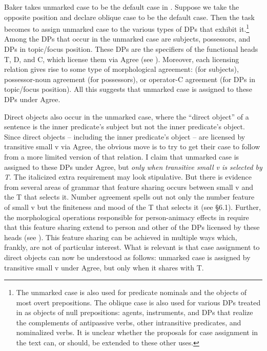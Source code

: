 \documentclass[output=paper,
modfonts
]{LSP/langsci}
\begin{document}
\begin{exe}
\begin{xlist}
Baker takes unmarked case to be the default case in . Suppose we
take the opposite position and declare oblique case to be the default
case. Then the task becomes to assign unmarked case to the various types
of  DPs that exhibit it.\footnote{The unmarked case is also used
  for predicate nominals and the objects of most overt prepositions. The
  oblique case is also used for various DPs treated in \citealt{chung1998} as
  objects of null prepositions:  agents, instruments, and DPs
  that realize the complements of antipassive verbs, other intransitive
  predicates, and nominalized verbs. It is unclear whether the proposals
  for case assignment in the text can, or should, be extended to these
  other uses.} Among the DPs that occur in the unmarked case are
subjects, possessors, and DPs in topic/focus position. These DPs are the
specifiers of the functional heads T, D, and C, which license them via
Agree (see \citealt{chung1998}). Moreover, each licensing relation gives rise to
some type of morphological agreement:  (for
subjects), possessor-noun agreement (for possessors), or operator-C
agreement (for DPs in topic/focus position). All this suggests that
unmarked case is assigned to these DPs under Agree.

Direct objects also occur in the unmarked case, where the ``direct
object'' of a  sentence is the inner predicate's subject but not
the inner predicate's object. Since direct objects -- including the inner
predicate's object -- are licensed by transitive small v via Agree, the
obvious move is to try to get their case to follow from a more limited
version of that relation. I claim that unmarked case is assigned to
these DPs under Agree, but \emph{only when transitive small v is
selected by T}. The italicized extra requirement may look stipulative.
But there is evidence from several areas of  grammar that
feature sharing occurs between small v and the T that selects it. Number
agreement spells out not only the number feature of small v but the
finiteness and mood  of the T that selects it (see \S6.1).
Further, the morphological operations responsible for person-animacy
effects in  require that this feature sharing extend to person
and other  of the DPs licensed by these heads (see \citealt{chung1998,chung2014}). This feature sharing can be achieved in multiple ways which,
frankly, are not of particular interest. What is relevant is that case
assignment to direct objects can now be understood as follows: unmarked
case is assigned by transitive small v under Agree, but only when it
shares  with T.


\end{xlist}
\end{exe}
\end{document}
